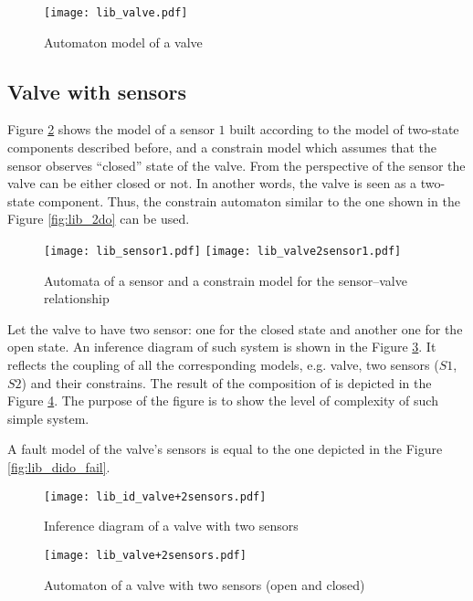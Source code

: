 \begin{figure}[!th]
	\centering
	\texttt{[image: lib\_valve.pdf]}
	\caption{Automaton model of a valve}
	\label{fig:lib_valve}
\end{figure}


\subsection{Valve with sensors}

Figure \ref{fig:lib_valve2sensor1} shows the model of a sensor $1$ built
according to the model of two-state components described before, and a constrain
model which assumes that the sensor observes ``closed'' state of the valve.
From the perspective of the sensor the valve can be either closed or not. In
another words, the valve is seen as a two-state component. Thus, the constrain
automaton similar to the one shown in the Figure \ref{fig:lib_2do} can be used.

\begin{figure}[th]
	\centering
	\texttt{[image: lib\_sensor1.pdf]}
	\texttt{[image: lib\_valve2sensor1.pdf]}	
	\caption{Automata of a sensor and a constrain model for the sensor--valve
	relationship}
	\label{fig:lib_valve2sensor1}
\end{figure}

Let the valve to have two sensor: one for the closed state and another
one for the open state. An inference diagram of such system is shown in the
Figure \ref{fig:lib_id_valve+2sensors}. It reflects the coupling of all the
corresponding models, e.g. valve, two sensors ($S1$, $S2$) and their
constrains. The result of the composition of is depicted in the Figure
\ref{fig:lib_valve+2sensors}. The purpose of the figure is to show the level of
complexity of such simple system.

A fault model of the valve's sensors is equal to the one depicted in the Figure
\ref{fig:lib_dido_fail}.

\begin{figure}[!th]
	\centering
	\texttt{[image: lib\_id\_valve+2sensors.pdf]}
	\caption{Inference diagram of a valve with two sensors}
	\label{fig:lib_id_valve+2sensors}
\end{figure}

 
\begin{figure}[th]
	\centering
	\texttt{[image: lib\_valve+2sensors.pdf]}
	\caption{Automaton of a valve with two sensors (open and closed)}
	\label{fig:lib_valve+2sensors}
\end{figure}


